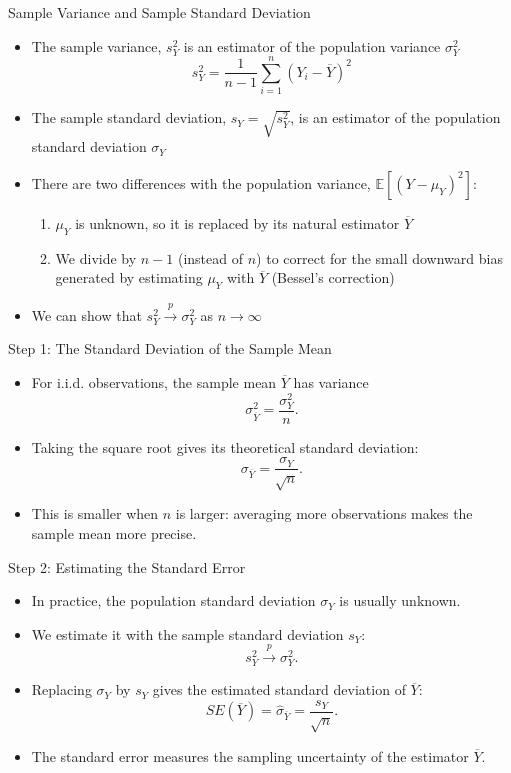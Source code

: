 \documentclass[notes,10pt, aspectratio=169]{beamer}
\begin{document}
\begin{frame}{Sample Variance and Sample Standard Deviation}
\begin{itemize}
    \item The sample variance, $s^2_Y$ is an estimator of the population variance $\sigma^2_Y$
    \begin{equation*}
        s^2_Y = \frac{1}{n-1}\sum_{i=1}^n (Y_i-\overline{Y})^2
    \end{equation*}
    \item The sample standard deviation, $s_Y = \sqrt{s^2_Y}$, is an estimator of the population standard deviation $\sigma_Y$
    \item There are two differences with the population variance, $\mathbb{E}[(Y-\mu_Y)^2]$:
    \begin{enumerate}
        \item $\mu_Y$ is unknown, so it is replaced by its natural estimator $\overline{Y}$
        \item We divide by $n-1$ (instead of $n$) to correct for the small downward bias generated by estimating $\mu_Y$ with $\overline{Y}$ (Bessel's correction)
    \end{enumerate}
    \item We can show that $s_Y^2 \xrightarrow{\mathit{p}}\sigma^2_Y$ as $n\rightarrow\infty$
\end{itemize}
\end{frame}

\begin{frame}{Step 1: The Standard Deviation of the Sample Mean}
\begin{itemize}
    \item For i.i.d. observations, the sample mean $\overline{Y}$ has variance
    \[
        \sigma_{\overline{Y}}^2=\frac{\sigma_Y^2}{n}.
    \]
    \item Taking the square root gives its theoretical standard deviation:
    \[
        \sigma_{\overline{Y}}=\frac{\sigma_Y}{\sqrt{n}}.
    \]
    \item This is smaller when $n$ is larger: averaging more observations makes the sample mean more precise.
\end{itemize}
\end{frame}

\begin{frame}{Step 2: Estimating the Standard Error}
\begin{itemize}
    \item In practice, the population standard deviation $\sigma_Y$ is usually unknown.
    \item We estimate it with the sample standard deviation $s_Y$:
    \[
        s_Y^2 \xrightarrow{\mathit{p}}\sigma_Y^2.
    \]
    \item Replacing $\sigma_Y$ by $s_Y$ gives the estimated standard deviation of $\overline{Y}$:
    \[
        SE(\overline{Y})
        =\widehat{\sigma}_{\overline{Y}}
        =\frac{s_Y}{\sqrt{n}}.
    \]
    \item The standard error measures the sampling uncertainty of the estimator $\overline{Y}$.
\end{itemize}
\end{frame}
\end{document}
